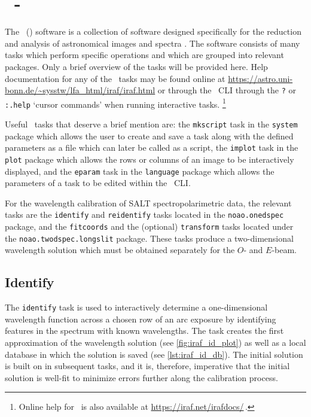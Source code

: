 \section[\textsc{iraf}]{\iraf\ - } \label{sec:iraf}

The \iraf\ () software is a collection of software designed specifically for the reduction and analysis of astronomical images and spectra \citep{iraf:1986, iraf:1993}.
The software consists of many tasks which perform specific operations and which are grouped into relevant packages.
Only a brief overview of the tasks will be provided here.
Help documentation for any of the \iraf\ tasks may be found online at \url{https://astro.uni-bonn.de/~sysstw/lfa_html/iraf/iraf.html} or through the \iraf\ \gls{CLI} through the \texttt{?} or \texttt{:.help} `cursor commands' when running interactive tasks.%
\footnote{Online help for \iraf\ is also available at \url{https://iraf.net/irafdocs/}\,.}

\pagebreak

Useful \iraf\ tasks that deserve a brief mention are: the \texttt{mkscript} task in the \texttt{system} package which allows the user to create and save a task along with the defined parameters as a file which can later be called as a script, the \texttt{implot} task in the \texttt{plot} package which allows the rows or columns of an image to be interactively displayed, and the \texttt{eparam} task in the \texttt{language} package which allows the parameters of a task to be edited within the \iraf\ \gls{CLI}.%

For the wavelength calibration of \gls{SALT} spectropolarimetric data, the relevant tasks are the \texttt{identify} and \texttt{reidentify} tasks located in the \texttt{noao.onedspec} package, and the \texttt{fitcoords} and the (optional) \texttt{transform} tasks located under the \texttt{noao.twodspec.long\-slit} package.
These tasks produce a two-dimensional wavelength solution which must be obtained separately for the $O$- and $E$-beam.

\subsection{Identify} \label{subsec:iraf_identify}

The \texttt{identify} task is used to interactively determine a one-dimensional wavelength function across a chosen row of an arc exposure by identifying features in the spectrum with known wavelengths.
The task creates the first approximation of the wavelength solution (see \autoref{fig:iraf_id_plot}) as well as a local database in which the solution is saved (see \autoref{lst:iraf_id_db}).
The initial solution is built on in subsequent tasks, and it is, therefore, imperative that the initial solution is well-fit to minimize errors further along the calibration process.

